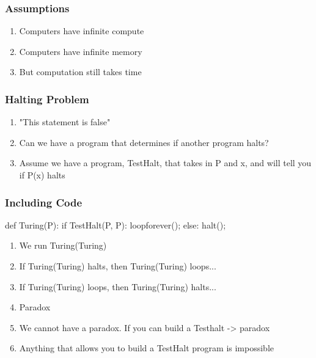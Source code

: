 \documentclass{beamer}
\begin{document}
\begin{frame}
  
  
  \frametitle{Assumptions}

  \begin{enumerate}
    \item Computers have infinite compute
    \item Computers have infinite memory
    \item But computation still takes time
  \end{enumerate}


\end{frame}

\begin{frame}
  
  
  \frametitle{Halting Problem}

  \begin{enumerate}[<+->]
    \item \alert{"This statement is false"}
    \item Can we have a program that determines if another program halts?
    \item Assume we have a program, TestHalt, that takes in P and x, and will tell you if P(x) halts
  \end{enumerate}


\end{frame}


\begin{frame}[fragile]
  \frametitle{Including Code}
  \begin{semiverbatim}
    def Turing(P):
      if TestHalt(P, P):
        loopforever();
      else:
        halt();
  \end{semiverbatim}
  
  \begin{enumerate}[<+->]
    \item We run Turing(Turing)
    \item If Turing(Turing) halts, then Turing(Turing) loops...
    \item If Turing(Turing) loops, then Turing(Turing) halts...
    \item Paradox
    \item We cannot have a paradox. If you can build a Testhalt -> paradox
    \item Anything that allows you to build a TestHalt program is impossible
  \end{enumerate}
\end{frame}
\end{document}
